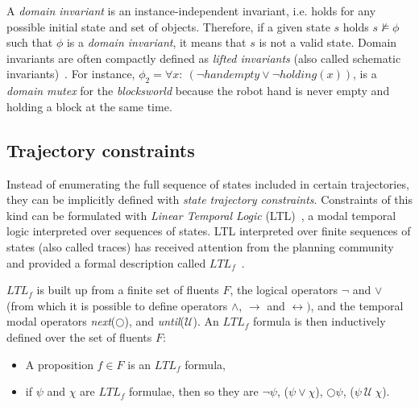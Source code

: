\documentclass[3p,times]{elsarticle}
\begin{document}
A {\em domain invariant} is an instance-independent invariant, i.e. holds for any possible initial state and set of objects. Therefore, if a given state $s$ holds $s\nvDash \phi$ such that $\phi$ is a {\em domain invariant}, it means that $s$ is not a valid state. Domain invariants are often compactly defined as {\em lifted invariants} (also called schematic invariants)~\cite{rintanen:schematicInvariants:AAAI2017}. For instance, $\phi_2=\forall x:\ (\neg handempty\vee \neg holding(x))$, is a {\em domain mutex} for the {\em blocksworld} because the robot hand is never empty and holding a block at the same time.

\subsection{Trajectory constraints}
Instead of enumerating the full sequence of states included in certain trajectories, they can be implicitly defined with {\em state trajectory constraints}. Constraints of this kind can be formulated with {\em Linear Temporal Logic} (LTL)~\cite{haslum:LTL:ecai10,bacchus:LTL:1998}, a modal temporal logic interpreted over sequences of states. LTL interpreted over finite sequences of states (also called traces) has received attention from the planning community and provided a formal description called $LTL_f$~\cite{Giacomo:LTLf:AAAI2014}.

$LTL_f$ is built up from a finite set of fluents $F$, the logical operators $\neg$ and $\vee$ (from which it is possible to define operators $\wedge$, $\rightarrow$ and $\leftrightarrow)$, and the temporal modal operators {\em next}($\bigcirc$), and {\em until}(${\mathcal U}$). An $LTL_f$ formula is then inductively defined over the set of fluents $F$:
\begin{itemize}
\item A proposition $f\in F$ is an $LTL_f$ formula,
\item if $\psi$ and $\chi$ are $LTL_f$ formulae, then so they are $\neg\psi$, ($\psi\vee\chi$), $\bigcirc\psi$, ($\psi\ {\mathcal U}\ \chi$).
\end{itemize}
\end{document}
